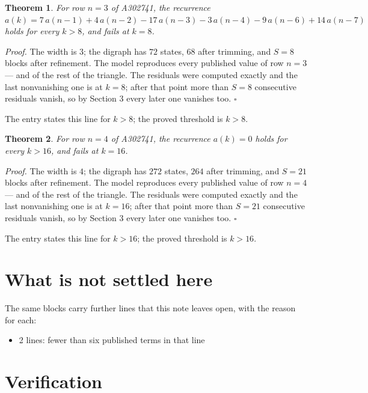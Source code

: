 \documentclass[11pt]{article}
\newtheorem{theorem}{Theorem}
\theoremstyle{definition}
\begin{document}
\begin{theorem} For row $n = 3$ of A302741, the recurrence $a(k) = 7\,a(n-1) + 4\,a(n-2) - 17\,a(n-3) - 3\,a(n-4) - 9\,a(n-6) + 14\,a(n-7)$ holds for every $k > 8$, and fails at $k = 8$.\end{theorem}

{\itshape Proof.} The width is $3$; the digraph has $72$ states, $68$ after trimming, and $S = 8$ blocks after refinement. The model reproduces every published value of row $n = 3$ --- and of the rest of the triangle. The residuals were computed exactly and the last nonvanishing one is at $k = 8$; after that point more than $S = 8$ consecutive residuals vanish, so by Section 3 every later one vanishes too. $\square$

The entry states this line for $k > 8$; the proved threshold is $k > 8$.

\begin{theorem} For row $n = 4$ of A302741, the recurrence $a(k) = 0$ holds for every $k > 16$, and fails at $k = 16$.\end{theorem}

{\itshape Proof.} The width is $4$; the digraph has $272$ states, $264$ after trimming, and $S = 21$ blocks after refinement. The model reproduces every published value of row $n = 4$ --- and of the rest of the triangle. The residuals were computed exactly and the last nonvanishing one is at $k = 16$; after that point more than $S = 21$ consecutive residuals vanish, so by Section 3 every later one vanishes too. $\square$

The entry states this line for $k > 16$; the proved threshold is $k > 16$.

\section{What is not settled here}

The same blocks carry further lines that this note leaves open, with the reason for each:

\begin{itemize}

\item 2 lines: fewer than six published terms in that line

\end{itemize}

\section{Verification}
\end{document}

